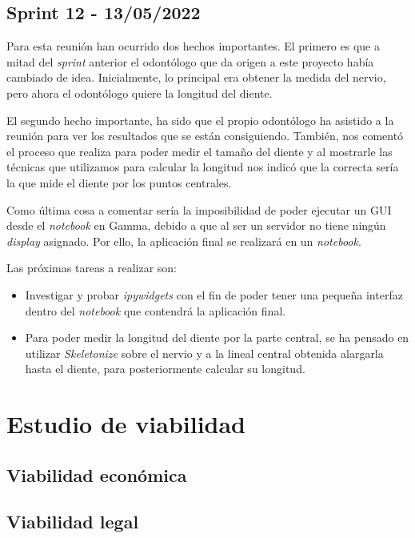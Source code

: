 \subsection{Sprint 12 - 13/05/2022}
Para esta reunión han ocurrido dos hechos importantes. El primero es que a mitad del \emph{sprint} anterior el odontólogo que da origen a este proyecto había cambiado de idea. Inicialmente, lo principal era obtener la medida del nervio, pero ahora el odontólogo quiere la longitud del diente.

El segundo hecho importante, ha sido que el propio odontólogo ha asistido a la reunión para ver los resultados que se están consiguiendo. También, nos comentó el proceso que realiza para poder medir el tamaño del diente y al mostrarle las técnicas que utilizamos para calcular la longitud nos indicó que la correcta sería la que mide el diente por los puntos centrales.

Como última cosa a comentar sería la imposibilidad de poder ejecutar un GUI desde el \emph{notebook} en Gamma, debido a que al ser un servidor no tiene ningún \emph{display}
asignado. Por ello, la aplicación final se realizará en un \emph{notebook}.

Las próximas tareas a realizar son:
\begin{itemize}
    \item Investigar y probar \emph{ipywidgets} con el fin de poder tener una pequeña interfaz dentro del \emph{notebook} que contendrá la aplicación final.
    \item Para poder medir la longitud del diente por la parte central, se ha pensado en utilizar \emph{Skeletonize} sobre el nervio y a la lineal central obtenida alargarla hasta el diente, para posteriormente calcular su longitud.
\end{itemize}
\section{Estudio de viabilidad}

\subsection{Viabilidad económica}

\subsection{Viabilidad legal}


